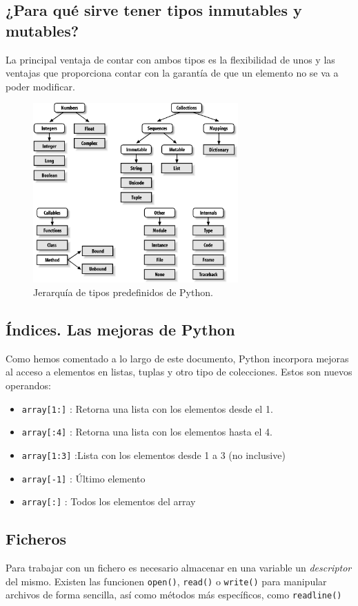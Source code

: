 \documentclass[12pt]{article} %
\begin{document}
\subsection{¿Para qué sirve tener tipos inmutables y mutables?}
La principal ventaja de contar con ambos tipos es la flexibilidad de unos y las ventajas que proporciona contar con la garantía de que un elemento no se va a poder modificar.
\begin{figure} %
  \begin{center}
    \includegraphics[width=0.7\textwidth]{tree.png}
  \end{center}
  \caption{Jerarquía de tipos predefinidos de Python.}
\end{figure}
\subsection{Índices. Las mejoras de Python}
Como hemos comentado a lo largo de este documento, Python incorpora mejoras al acceso a elementos en listas, tuplas y otro tipo de colecciones. Estos son nuevos operandos:
\begin{itemize}
	\item \verb+array[1:]+ : Retorna una lista con los elementos desde el 1.
	\item \verb+array[:4]+ : Retorna una lista con los elementos hasta el 4.
	\item \verb+array[1:3]+ :Lista con los elementos desde 1 a 3 (no inclusive)
	\item \verb+array[-1]+ : Último elemento
	\item \verb+array[:]+ : Todos los elementos del array
\end{itemize}
\subsection{Ficheros}
Para trabajar con un fichero es necesario almacenar en una variable un \textit{descriptor} del mismo. Existen las funcionen \verb+open()+, \verb+read()+ o \verb+write()+ para manipular archivos de forma sencilla, así como métodos más específicos, como \verb+readline()+
\end{document}
